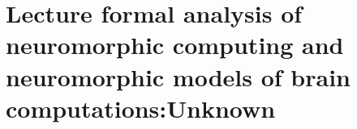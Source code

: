 \section{ Lecture formal analysis of neuromorphic computing and neuromorphic models of brain computations:Unknown }\label{sec:q5}    
